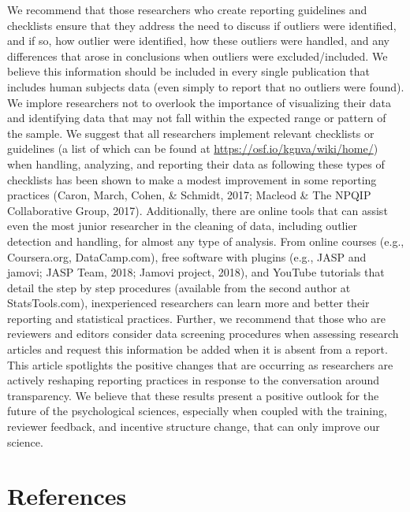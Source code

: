\documentclass[english,,man]{apa6}
\begin{document}
We recommend that those researchers who create reporting guidelines and checklists ensure that they address the need to discuss if outliers were identified, and if so, how outlier were identified, how these outliers were handled, and any differences that arose in conclusions when outliers were excluded/included. We believe this information should be included in every single publication that includes human subjects data (even simply to report that no outliers were found). We implore researchers not to overlook the importance of visualizing their data and identifying data that may not fall within the expected range or pattern of the sample. We suggest that all researchers implement relevant checklists or guidelines (a list of which can be found at \url{https://osf.io/kgnva/wiki/home/}) when handling, analyzing, and reporting their data as following these types of checklists has been shown to make a modest improvement in some reporting practices (Caron, March, Cohen, \& Schmidt, 2017; Macleod \& The NPQIP Collaborative Group, 2017). Additionally, there are online tools that can assist even the most junior researcher in the cleaning of data, including outlier detection and handling, for almost any type of analysis. From online courses (e.g., Coursera.org, DataCamp.com), free software with plugins (e.g., JASP and jamovi; JASP Team, 2018; Jamovi project, 2018), and YouTube tutorials that detail the step by step procedures (available from the second author at StatsTools.com), inexperienced researchers can learn more and better their reporting and statistical practices. Further, we recommend that those who are reviewers and editors consider data screening procedures when assessing research articles and request this information be added when it is absent from a report. This article spotlights the positive changes that are occurring as researchers are actively reshaping reporting practices in response to the conversation around transparency. We believe that these results present a positive outlook for the future of the psychological sciences, especially when coupled with the training, reviewer feedback, and incentive structure change, that can only improve our science.

\newpage

\hypertarget{references}{%
\section{References}\label{references}}

\setlength{\parindent}{-0.5in}
\setlength{\leftskip}{0.5in}
\end{document}
